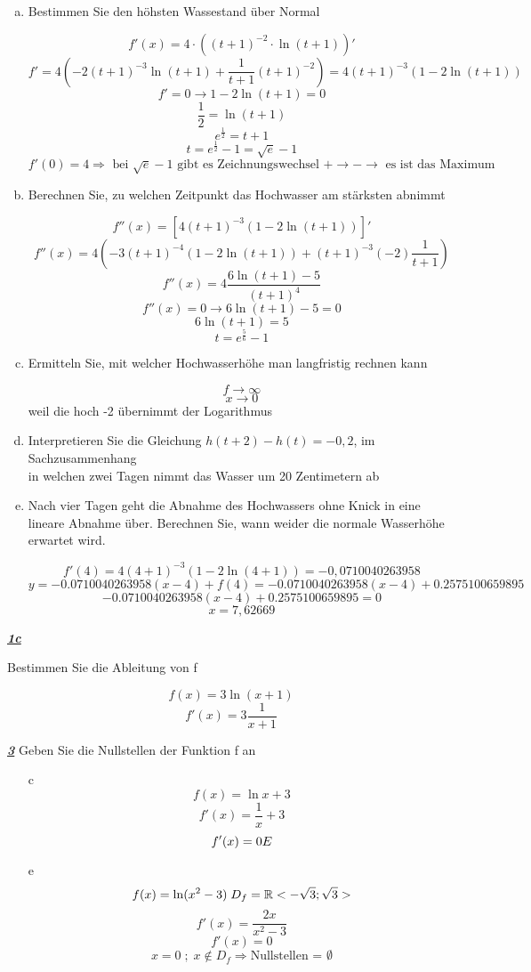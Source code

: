 \documentclass{article}
\begin{document}
\begin{enumerate}[a)]

\item Bestimmen Sie den höhsten Wassestand über Normal

\[f'(x) = 4 \cdot ((t+1)^{-2}\cdot \ln(t+1))'\]
\[f' = 4 (-2(t+1)^{-3}\ln(t+1) + \frac 1{t+1} (t+1)^{-2}) = 4(t+1)^{-3}(1-2\ln(t+1))\]
\[f' = 0 \rightarrow 1-2\ln(t+1) = 0\]
\[\frac 12=\ln(t+1)\]
\[e^{\frac12} = t+1\]
\[t = e^{\frac12}-1 = \sqrt e -1\]
\[f'(0) = 4 \Rightarrow \text{ bei } \sqrt e -1 \text{ gibt es Zeichnungswechsel } + \to - \rightarrow \text{ es ist das Maximum}\]

\item Berechnen Sie, zu welchen Zeitpunkt das Hochwasser am stärksten abnimmt

\[f''(x) = [4(t+1)^{-3}(1-2\ln(t+1))]' \]
\[f''(x) = 4(-3(t+1)^{-4}(1-2\ln(t+1)) + (t+1)^{-3}(-2)\frac1{t+1}) \]
\[f''(x) = 4\frac{6\ln(t+1)-5}{(t+1)^4}\]
\[f''(x) = 0 \rightarrow 6\ln(t+1)-5=0\]
\[6\ln(t+1)=5\]
\[t = e^{\frac 56}-1\]

\item Ermitteln Sie, mit welcher Hochwasserhöhe man langfristig rechnen kann

\[ f \to \infty\]
\[x \to 0\]
weil die hoch -2 übernimmt der Logarithmus

\item Interpretieren Sie die Gleichung $ h(t+2) - h(t) = -0,2$, im Sachzusammenhang
\\
in welchen zwei Tagen nimmt das Wasser um 20 Zentimetern ab

\item Nach vier Tagen geht die Abnahme des Hochwassers ohne Knick in eine lineare Abnahme über. Berechnen Sie, wann weider die normale Wasserhöhe erwartet wird.

\[f'(4) = 4(4+1)^{-3}(1-2\ln(4+1)) = -0,0710040263958\]
\[y = -0.0710040263958(x-4)+f(4) = -0.0710040263958(x-4)+0.2575100659895\]
\[-0.0710040263958(x-4)+0.2575100659895 = 0\]
\[x = 7,62669\]

\end{enumerate}

\underline{\textit{\textbf{1c}}}

Bestimmen Sie die Ableitung von f

\[f(x) = 3\ln(x+1)\]
\[f'(x) = 3 \frac 1 {x+1}\]

\underline{\textit{\textbf{3}}}
Geben Sie die Nullstellen der Funktion f an

\begin{enumerate}[a)]
\item[c]
\[f(x) = \ln  x +3\]
\[f'(x) = \frac 1 x +3\]
\[f'(x) = 0 \Lightning \]

\item[e]
\[f(x) = \ln(x^2 - 3) \; D_f = \mathbb{R} \\ <-\sqrt3; \sqrt3>\]
\[f'(x) = \frac {2x}{x^2 - 3}\] 
\[f'(x) = 0\]
\[x = 0 \; ; \; x \not \in D_f \Rightarrow \text{Nullstellen = }\emptyset\]
\end{enumerate}
\end{document}
